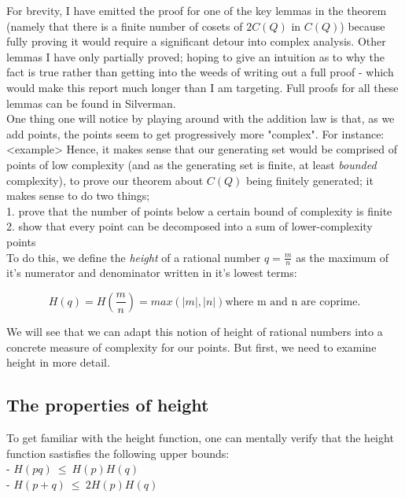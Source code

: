 \documentclass{article}
\begin{document}
For brevity, I have emitted the proof for one of the key lemmas in the theorem (namely that there is a finite number of cosets of $2C(Q)$ in $C(Q)$) because fully proving it would require a significant detour into complex analysis. Other lemmas I have only partially proved; hoping to give an intuition as to why the fact is true rather than getting into the weeds of writing out a full proof - which would make this report much longer than I am targeting. Full proofs for all these lemmas can be found in Silverman.\\

One thing one will notice by playing around with the addition law is that, as we add points, the points seem to get progressively more "complex". For instance: <example>
Hence, it makes sense that our generating set would be comprised of points of low complexity (and as the generating set is finite, at least \emph{bounded} complexity), to prove our theorem about $C(Q)$ being finitely generated; it makes sense to do two things;\\

1. prove that the number of points below a certain bound of complexity is finite \\

2. show that every point can be decomposed into a sum of lower-complexity points \\

To do this, we define the \emph{height} of a rational number $q = \frac{m}{n}$ as the maximum of it's numerator and denominator written in it's lowest terms:

\[ H(q) = H(\frac{m}{n}) = max(|m|, |n|) \text{where m and n are coprime.} \]

We will see that we can adapt this notion of height of rational numbers into a concrete measure of complexity for our points. But first, we need to examine height in more detail.

\subsection{The properties of height}

To get familiar with the height function, one can mentally verify that the height function sastisfies the following upper bounds:\\

- $ H(pq) \ \leq \ H(p)H(q) $\\

- $ H(p + q) \ \leq \ 2H(p)H(q) $\\
\end{document}
